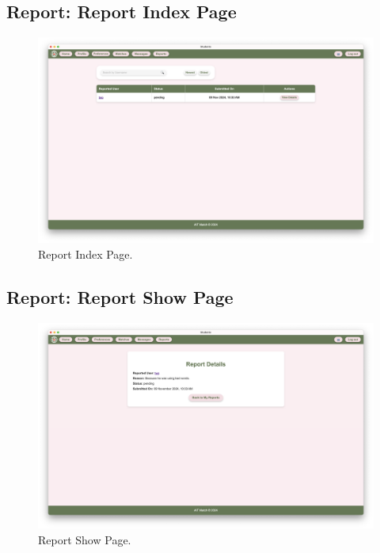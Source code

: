         \subsection{Report: Report Index Page}
        \begin{figure}[h]
                \centering
                \captionsetup{justification=centering, singlelinecheck=false, labelsep=space}
                \includegraphics[width=5in]{figures/results/reports/report-index-page.png}
                \caption{Report Index Page.}
                \label{fig:report-index-page}
            \end{figure}

        \newpage
        \subsection{Report: Report Show Page}
        \begin{figure}[h]
                \centering
                \captionsetup{justification=centering, singlelinecheck=false, labelsep=space}
                \includegraphics[width=5in]{figures/results/reports/report-show-page.png}
                \caption{Report Show Page.}
                \label{fig:report-show-page}
            \end{figure}
        \newpage
